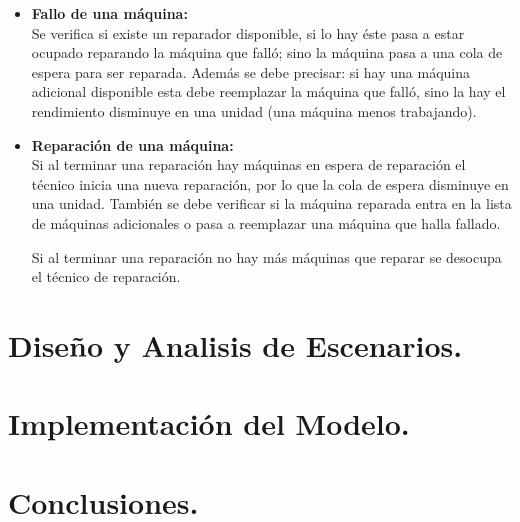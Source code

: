 \documentclass[10pt]{article}
\begin{document}
\begin{itemize}
\item \textbf{Fallo de una máquina:}\\
Se verifica si existe un reparador disponible, si lo hay éste pasa a estar ocupado reparando la máquina que falló; sino la máquina pasa a una cola de espera para ser reparada.
Además se debe precisar: si hay una máquina adicional disponible esta debe reemplazar la máquina que falló, sino la hay el rendimiento disminuye en una unidad (una máquina menos trabajando).


\item \textbf{Reparación de una máquina:}\\
Si al terminar una reparación hay máquinas en espera de reparación el técnico inicia una nueva reparación, por lo que la cola de espera disminuye en una unidad. También se debe verificar si
la máquina reparada entra en la lista de máquinas adicionales o pasa a reemplazar una máquina que halla fallado.

Si al terminar una reparación no hay más máquinas que reparar se desocupa el técnico de reparación.

\end{itemize}



\section{Diseño y Analisis de Escenarios.}


\section{Implementación del Modelo.}




\section{Conclusiones.}
\end{document}
